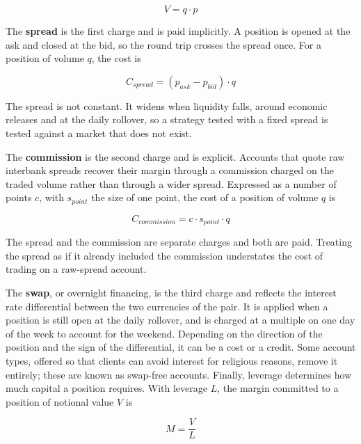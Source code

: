 \begin{equation}
V = q \cdot p
\end{equation}

The \textbf{spread} is the first charge and is paid implicitly. A position is opened at the ask and closed at the bid, so the round trip crosses the spread once. For a position of volume $q$, the cost is

\begin{equation}
C_{spread} = (p_{ask} - p_{bid}) \cdot q
\label{Equation:SpreadCost}
\end{equation}

The spread is not constant. It widens when liquidity falls, around economic releases and at the daily rollover, so a strategy tested with a fixed spread is tested against a market that does not exist.

The \textbf{commission} is the second charge and is explicit. Accounts that quote raw interbank spreads recover their margin through a commission charged on the traded volume rather than through a wider spread. Expressed as a number of points $c$, with $s_{point}$ the size of one point, the cost of a position of volume $q$ is

\begin{equation}
C_{commission} = c \cdot s_{point} \cdot q
\label{Equation:CommissionCost}
\end{equation}

The spread and the commission are separate charges and both are paid. Treating the spread as if it already included the commission understates the cost of trading on a raw-spread account.

The \textbf{swap}, or overnight financing, is the third charge and reflects the interest rate differential between the two currencies of the pair. It is applied when a position is still open at the daily rollover, and is charged at a multiple on one day of the week to account for the weekend. Depending on the direction of the position and the sign of the differential, it can be a cost or a credit. Some account types, offered so that clients can avoid interest for religious reasons, remove it entirely; these are known as swap-free accounts. Finally, leverage determines how much capital a position requires. With leverage $L$, the margin committed to a position of notional value $V$ is

\begin{equation}
M = \frac{V}{L}
\end{equation}

